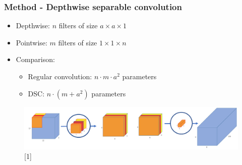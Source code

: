 \documentclass[9pt]{beamer}
\providecommand{\sourcefix}[1]{\\ \footnotesize \tugreen{Source:} [#1]}
\newenvironment{myframe}[1][]{%
\begin{frame}%
\frametitle{#1}
\setcounter{footnote}{0}


}{%
\end{frame}%
}
\begin{document}
\begin{myframe}[Method - Depthwise separable convolution]
    \begin{itemize}
        \item Depthwise: $n$ filters of size $a \times a \times 1$
        \item Pointwise: $m$ filters of size $1 \times 1 \times n$
        \item Comparison:
        \begin{itemize}
            \item Regular convolution: $n \cdot m \cdot a^2$ parameters
            \item DSC: $n \cdot (m + a^2)$ parameters
        \end{itemize} 
    \end{itemize}

    \begin{figure}
        \includegraphics[width=.99\textwidth]{depthwise-visualization.png}
        \sourcefix{1}
    \end{figure}

\end{myframe}
\end{document}
